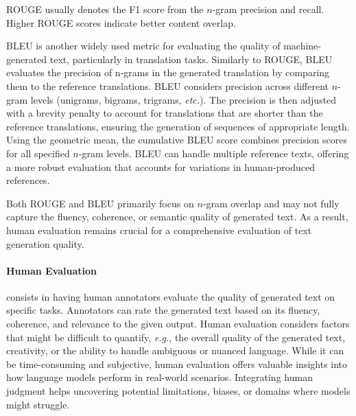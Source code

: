\noindent ROUGE usually denotes the F1 score from the $n$-gram precision and recall. Higher ROUGE scores indicate better content overlap. 

\ac{BLEU} is another widely used metric for evaluating the quality of machine-generated text, particularly in translation tasks. Similarly to \ac{ROUGE}, \ac{BLEU} evaluates the precision of n-grams in the generated translation by comparing them to the reference translations. \ac{BLEU} considers precision across different $n$-gram levels (unigrams, bigrams, trigrams, \textit{etc.}). The precision is then adjusted with a brevity penalty to account for translations that are shorter than the reference translations, ensuring the generation of sequences of appropriate length. Using the geometric mean, the cumulative \ac{BLEU} score combines precision scores for all specified $n$-gram levels. \ac{BLEU} can handle multiple reference texts, offering a more robust evaluation that accounts for variations in human-produced references.

Both \ac{ROUGE} and \ac{BLEU} primarily focus on $n$-gram overlap and may not fully capture the fluency, coherence, or semantic quality of generated text. As a result, human evaluation remains crucial for a comprehensive evaluation of text generation quality.

\paragraph{Human Evaluation} consists in having human annotators evaluate the quality of generated text on specific tasks. Annotators can rate the generated text based on its fluency, coherence, and relevance to the given output. Human evaluation considers factors that might be difficult to quantify, \textit{e.g.}, the overall quality of the generated text, creativity, or the ability to handle ambiguous or nuanced language. While it can be time-consuming and subjective, human evaluation offers valuable insights into how language models perform in real-world scenarios. Integrating human judgment helps uncovering potential limitations, biases, or domains where models might struggle. 


